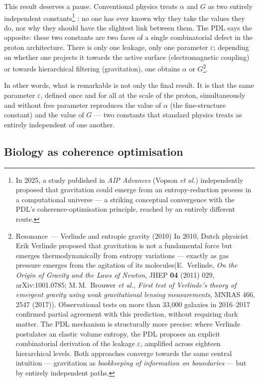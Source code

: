 \documentclass[11pt, a4paper, openright]{book}
\begin{document}
This result deserves a pause. Conventional physics treats $\alpha$ and $G$ as two entirely independent constants\footnote{In 2025, a study published in \textit{AIP Advances} (Vopson \textit{et al.})
independently proposed that gravitation could emerge from an entropy-reduction process
in a computational universe --- a striking conceptual convergence with the PDL's
coherence-optimisation principle, reached by an entirely different route.}
: no one has ever known why they take the values they do, nor why they should have the slightest link between them. The PDL says the opposite: these two constants are two faces of a single combinatorial defect in the proton architecture. There is only one leakage, only one parameter $\varepsilon$; depending on whether one projects it towards the active surface (electromagnetic coupling) or towards hierarchical filtering (gravitation), one obtains $\alpha$ or $G$\footnote{Resonance~--- Verlinde and entropic gravity (2010) In 2010, Dutch physicist Erik Verlinde proposed that gravitation is not a fundamental force but emerges thermodynamically from entropy variations --- exactly as gas pressure emerges from the agitation of its molecules(E.\ Verlinde, \textit{On the Origin of Gravity and the Laws of Newton}, JHEP \textbf{04} (2011) 029, arXiv:1001.0785; M.\,M.\ Brouwer \textit{et al.}, \textit{First test of Verlinde's theory of emergent gravity using weak gravitational lensing measurements}, MNRAS 466, 2547 (2017)). Observational tests on more than 33{,}000 galaxies in 2016--2017 confirmed partial agreement with this prediction, without requiring dark matter. The PDL mechanism is structurally more precise: where Verlinde postulates an elastic volume entropy, the PDL proposes an explicit combinatorial derivation of the leakage $\varepsilon$, amplified across eighteen hierarchical levels. Both approaches converge towards the same central intuition --- gravitation as \emph{bookkeeping of information on boundaries} --- but by entirely independent paths.}.

\medskip

In other words, what is remarkable is not only the final result. It is that the same parameter $\varepsilon$, defined once and for all at the scale of the proton, simultaneously and without free parameter reproduces the value of $\alpha$ (the fine-structure constant) and the value of $G$ — two constants that standard physics treats as entirely independent of one another.

\subsection*{Biology as coherence optimisation}
\end{document}

